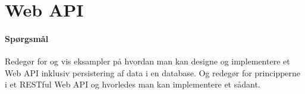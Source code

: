 \section{Web API}

\paragraph{Spørgsmål}
Redegør for og vis eksampler på hvordan man kan designe	og implementere et Web API inklusiv persistering af data i en database.	Og redegør for principperne i et RESTful Web API og	hvorledes man kan implementere et sådant.
